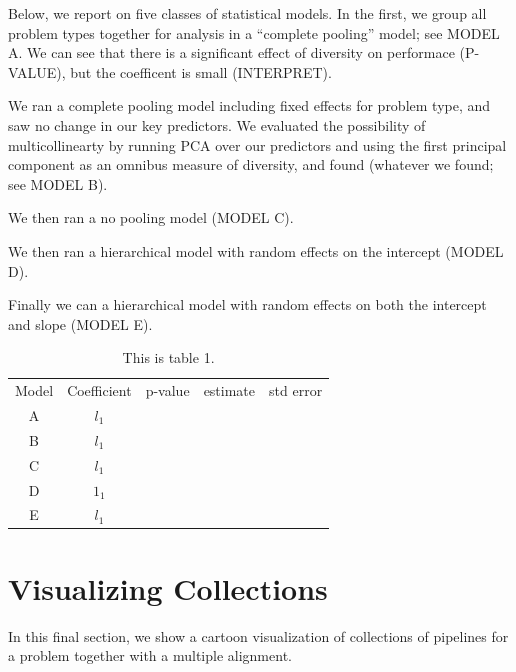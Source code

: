 \documentclass{article}
\begin{document}
Below, we report on five classes of statistical models. In the first,
we group all problem types together for analysis in a ``complete
pooling'' model; see MODEL A. We can see that there is a significant
effect of diversity on performace (P-VALUE), but the coefficent is
small (INTERPRET).

We ran a complete pooling model including fixed effects for problem
type, and saw no change in our key predictors. We evaluated the
possibility of multicollinearty by running PCA over our predictors and
using the first principal component as an omnibus measure of
diversity, and found (whatever we found; see MODEL B).

We then ran a no pooling model (MODEL C).

We then ran a hierarchical model with random effects on the intercept
(MODEL D).

Finally we can a hierarchical model with random effects on both the
intercept and slope (MODEL E).

\begin{table}
  \begin{tabular}{c|c|c|c|c}
    Model & Coefficient & p-value & estimate & std error \\
    A & $l_1$ & & & \\
    B & $l_1$ & & & \\
    C & $l_1$ & & & \\
    D & $1_1$ & & & \\
    E & $l_1$ & & &
  \end{tabular}
  \caption{This is table 1.}
\end{table}
\section{Visualizing Collections}
\label{sec:visualization}
In this final section, we show a cartoon visualization of collections
of pipelines for a problem together with a multiple alignment.
\end{document}
